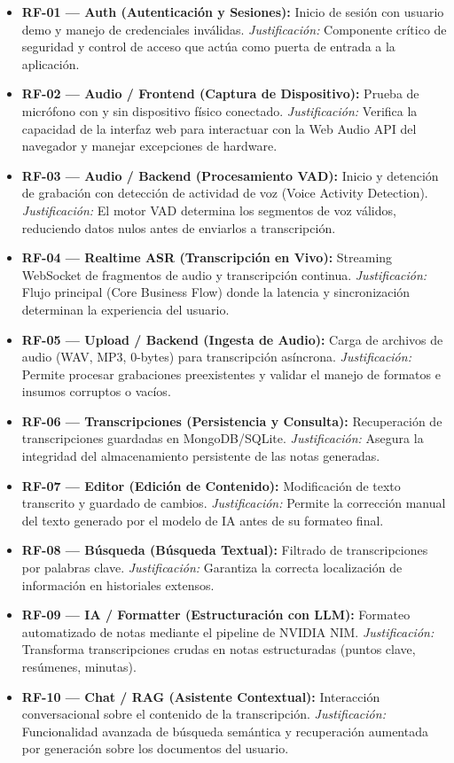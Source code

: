 \begin{itemize}
    \item \textbf{RF-01 --- Auth (Autenticación y Sesiones):} Inicio de sesión con usuario demo y manejo de credenciales inválidas. \textit{Justificación:} Componente crítico de seguridad y control de acceso que actúa como puerta de entrada a la aplicación.
    \item \textbf{RF-02 --- Audio / Frontend (Captura de Dispositivo):} Prueba de micrófono con y sin dispositivo físico conectado. \textit{Justificación:} Verifica la capacidad de la interfaz web para interactuar con la Web Audio API del navegador y manejar excepciones de hardware.
    \item \textbf{RF-03 --- Audio / Backend (Procesamiento VAD):} Inicio y detención de grabación con detección de actividad de voz (Voice Activity Detection). \textit{Justificación:} El motor VAD determina los segmentos de voz válidos, reduciendo datos nulos antes de enviarlos a transcripción.
    \item \textbf{RF-04 --- Realtime ASR (Transcripción en Vivo):} Streaming WebSocket de fragmentos de audio y transcripción continua. \textit{Justificación:} Flujo principal (Core Business Flow) donde la latencia y sincronización determinan la experiencia del usuario.
    \item \textbf{RF-05 --- Upload / Backend (Ingesta de Audio):} Carga de archivos de audio (WAV, MP3, 0-bytes) para transcripción asíncrona. \textit{Justificación:} Permite procesar grabaciones preexistentes y validar el manejo de formatos e insumos corruptos o vacíos.
    \item \textbf{RF-06 --- Transcripciones (Persistencia y Consulta):} Recuperación de transcripciones guardadas en MongoDB/SQLite. \textit{Justificación:} Asegura la integridad del almacenamiento persistente de las notas generadas.
    \item \textbf{RF-07 --- Editor (Edición de Contenido):} Modificación de texto transcrito y guardado de cambios. \textit{Justificación:} Permite la corrección manual del texto generado por el modelo de IA antes de su formateo final.
    \item \textbf{RF-08 --- Búsqueda (Búsqueda Textual):} Filtrado de transcripciones por palabras clave. \textit{Justificación:} Garantiza la correcta localización de información en historiales extensos.
    \item \textbf{RF-09 --- IA / Formatter (Estructuración con LLM):} Formateo automatizado de notas mediante el pipeline de NVIDIA NIM. \textit{Justificación:} Transforma transcripciones crudas en notas estructuradas (puntos clave, resúmenes, minutas).
    \item \textbf{RF-10 --- Chat / RAG (Asistente Contextual):} Interacción conversacional sobre el contenido de la transcripción. \textit{Justificación:} Funcionalidad avanzada de búsqueda semántica y recuperación aumentada por generación sobre los documentos del usuario.
\end{itemize}

